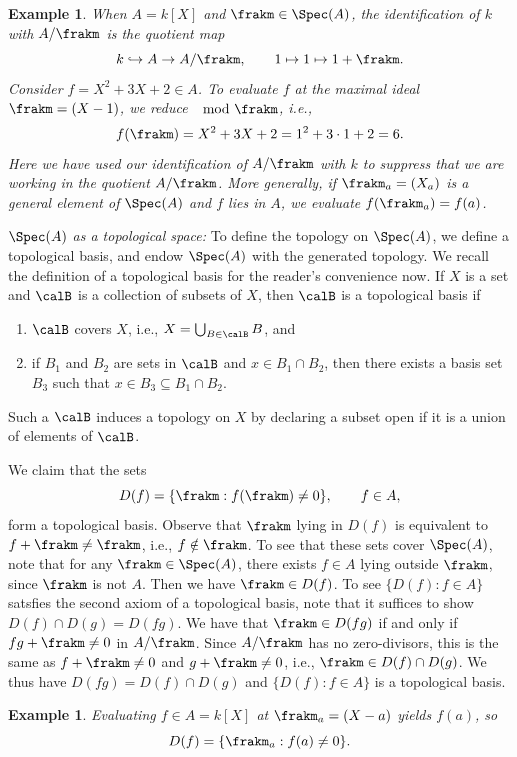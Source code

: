 \documentclass[12pt]{amsart}
\theoremstyle{plain}
\newtheorem{example}[theorem]{Example}
\begin{document}
\begin{example}
When $A=k[X]$ and $\frakm \in \Spec(A)$, the identification of $k$ with $A/\frakm$ is the quotient map
$$k \hookrightarrow A \to A/\frakm, \qquad 1 \mapsto 1 \mapsto 1+\frakm.$$
Consider $f = X^2 +3X +2 \in A$.
To evaluate $f$ at the maximal ideal $\frakm = (X-1)$, we reduce $\mod \frakm$, i.e.,
$$f(\frakm) = X^2 + 3X +2 = 1^2 + 3\cdot 1 +2 = 6.$$
Here we have used our identification of $A/\frakm$ with $k$ to suppress that we are working in the quotient $A/\frakm$.
More generally, if $\frakm_a = (X_a)$ is a general element of $\Spec(A)$ and $f$ lies in $A$, we evaluate $f(\frakm_a) = f(a)$.
\end{example}

\emph{$\Spec(A)$ as a topological space:}
To define the topology on $\Spec(A)$, we define a topological basis, and endow $\Spec(A)$ with the generated topology.
We recall the definition of a topological basis for the reader's convenience now.
If $X$ is a set and $\calB$ is a collection of subsets of $X$, then $\calB$ is a topological basis if
\begin{enumerate}
\item $\calB$ covers $X$, i.e., $X = \bigcup_{B \in \calB} B$, and
\item if $B_1$ and $B_2$ are sets in $\calB$ and $x \in B_1 \cap B_2$, then there exists a basis set $B_3$ such that $x \in B_3 \subseteq B_1 \cap B_2$.
\end{enumerate}
Such a $\calB$ induces a topology on $X$ by declaring a subset open if it is a union of elements of $\calB$.

We claim that the sets 
$$D(f) = \{\frakm : f(\frakm) \ne 0\}, \qquad f \in A,$$
form a topological basis.
Observe that $\frakm$ lying in $D(f)$ is equivalent to $f + \frakm \ne \frakm$, i.e., $f \notin \frakm$.
To see that these sets cover $\Spec(A)$, note that for any $\frakm \in \Spec(A)$, there exists $f \in A$ lying outside $\frakm$, since $\frakm$ is not $A$.
Then we have $\frakm \in D(f)$.
To see $\{D(f) : f \in A\}$ satsfies the second axiom of a topological basis, note that it suffices to show $D(f) \cap D(g) = D(fg)$.
We have that $\frakm \in D(fg)$ if and only if $fg +\frakm \ne 0$ in $A/\frakm$.
Since $A/\frakm$ has no zero-divisors, this is the same as $f+\frakm \ne 0$ and $g+\frakm \ne 0$, i.e., $\frakm \in D(f) \cap D(g)$.
We thus have $D(fg)=D(f)\cap D(g)$ and $\{D(f) : f \in A\}$ is a topological basis.

\begin{example}
Evaluating $f \in A=k[X]$ at $\frakm_a=(X-a)$ yields $f(a)$, so 
$$D(f) = \{\frakm_a : f(a) \ne 0\}.$$
\end{example}
\end{document}
